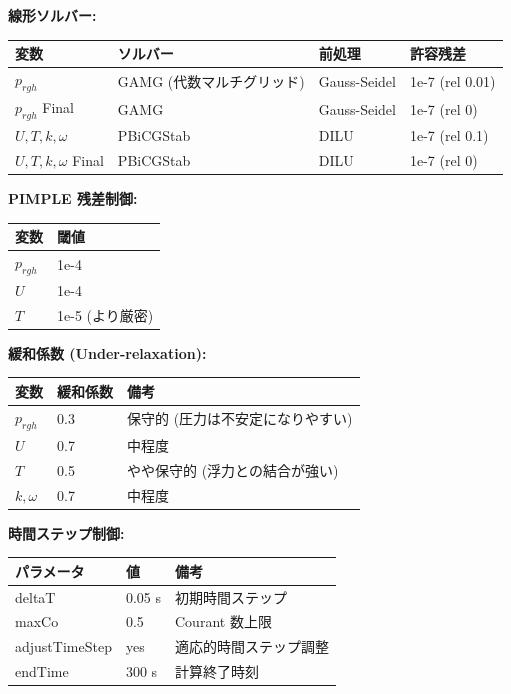 \documentclass[a4paper,11pt]{article}
\begin{document}
\textbf{線形ソルバー:}

{\small
\noindent
\begin{tabularx}{\textwidth}{|l|L|L|L|}
\hline
\textbf{変数} & \textbf{ソルバー} & \textbf{前処理} & \textbf{許容残差} \\
\hline
$p_{rgh}$ & GAMG (代数マルチグリッド) & Gauss-Seidel & 1e-7 (rel 0.01) \\
\hline
$p_{rgh}$ Final & GAMG & Gauss-Seidel & 1e-7 (rel 0) \\
\hline
$U, T, k, \omega$ & PBiCGStab & DILU & 1e-7 (rel 0.1) \\
\hline
$U, T, k, \omega$ Final & PBiCGStab & DILU & 1e-7 (rel 0) \\
\hline
\end{tabularx}
}


\textbf{PIMPLE 残差制御:}

{\small
\noindent
\begin{tabularx}{\textwidth}{|L|L|}
\hline
\textbf{変数} & \textbf{閾値} \\
\hline
$p_{rgh}$ & 1e-4 \\
\hline
$U$ & 1e-4 \\
\hline
$T$ & 1e-5 (より厳密) \\
\hline
\end{tabularx}
}


\textbf{緩和係数 (Under-relaxation):}

{\small
\noindent
\begin{tabularx}{\textwidth}{|L|L|L|}
\hline
\textbf{変数} & \textbf{緩和係数} & \textbf{備考} \\
\hline
$p_{rgh}$ & 0.3 & 保守的 (圧力は不安定になりやすい) \\
\hline
$U$ & 0.7 & 中程度 \\
\hline
$T$ & 0.5 & やや保守的 (浮力との結合が強い) \\
\hline
$k, \omega$ & 0.7 & 中程度 \\
\hline
\end{tabularx}
}


\textbf{時間ステップ制御:}

{\small
\noindent
\begin{tabularx}{\textwidth}{|L|L|L|}
\hline
\textbf{パラメータ} & \textbf{値} & \textbf{備考} \\
\hline
deltaT & 0.05 s & 初期時間ステップ \\
\hline
maxCo & 0.5 & Courant 数上限 \\
\hline
adjustTimeStep & yes & 適応的時間ステップ調整 \\
\hline
endTime & 300 s & 計算終了時刻 \\
\hline
\end{tabularx}
}
\end{document}
